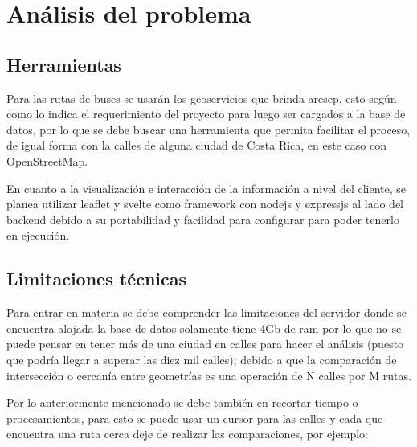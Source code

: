 


\section{Análisis del problema}
\subsection{Herramientas}

Para las rutas de buses se usarán los geoservicios que brinda aresep, esto según como lo indica el requerimiento del proyecto para luego ser cargados a la base de datos, por lo que se debe buscar una herramienta que permita facilitar el proceso, de igual forma con la calles de alguna ciudad de Costa Rica, en este caso con OpenStreetMap.

En cuanto a la visualización e interacción de la información a nivel del cliente, se planea utilizar leaflet y svelte como framework con nodejs y expressjs al lado del backend debido a su portabilidad y facilidad para configurar para poder tenerlo en ejecución.

\subsection{Limitaciones técnicas}
Para entrar en materia se debe comprender las limitaciones del servidor donde se encuentra alojada la base de datos solamente tiene 4Gb de ram por lo que no se puede pensar en tener más de una ciudad en calles para hacer el análisis (puesto que podría llegar a superar las diez mil calles); debido a que la comparación de intersección o cercanía entre geometrías es una operación de N calles por M rutas.

Por lo anteriormente mencionado se debe también en recortar tiempo o procesamientos, para esto se puede usar un cursor para las calles y cada que encuentra una ruta cerca deje de realizar las comparaciones, por ejemplo:

